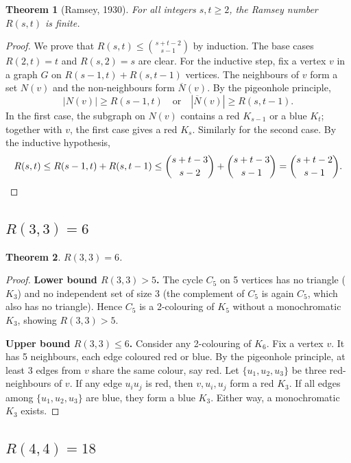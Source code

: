 \documentclass[12pt,a4paper]{amsart}
\newtheorem{theorem}{Theorem}[section]
\theoremstyle{definition}
\theoremstyle{remark}
\begin{document}
\begin{theorem}[Ramsey, 1930]\label{thm:ramsey-finite}
For all integers $s,t \ge 2$, the Ramsey number $R(s,t)$ is finite.
\end{theorem}

\begin{proof}
We prove that $R(s,t) \le \binom{s+t-2}{s-1}$ by induction.  The base cases
$R(2,t)=t$ and $R(s,2)=s$ are clear.  For the inductive step, fix a vertex $v$
in a graph $G$ on $R(s-1,t)+R(s,t-1)$ vertices.  The neighbours of $v$ form
a set $N(v)$ and the non-neighbours form $\overline{N}(v)$.  By the pigeonhole
principle,
\[
  |N(v)| \ge R(s-1,t) \quad \text{or} \quad |\overline{N}(v)| \ge R(s,t-1).
\]
In the first case, the subgraph on $N(v)$ contains a red $K_{s-1}$ or a blue
$K_t$; together with $v$, the first case gives a red $K_s$.  Similarly for the
second case.  By the inductive hypothesis,
\[
  R(s,t) \le R(s-1,t) + R(s,t-1) \le \binom{s+t-3}{s-2} + \binom{s+t-3}{s-1}
  = \binom{s+t-2}{s-1}.\qedhere
\]
\end{proof}

\subsection{\texorpdfstring{$R(3,3) = 6$}{R(3,3) = 6}}

\begin{theorem}\label{thm:r33}
$R(3,3) = 6$.
\end{theorem}

\begin{proof}
\textbf{Lower bound $R(3,3) > 5$.}
The cycle $C_5$ on 5 vertices has no triangle ($K_3$) and no independent set of
size 3 (the complement of $C_5$ is again $C_5$, which also has no triangle).
Hence $C_5$ is a 2-colouring of $K_5$ without a monochromatic $K_3$, showing
$R(3,3) > 5$.

\textbf{Upper bound $R(3,3) \le 6$.}
Consider any 2-colouring of $K_6$.  Fix a vertex $v$.  It has 5 neighbours,
each edge coloured red or blue.  By the pigeonhole principle, at least 3 edges
from $v$ share the same colour, say red.  Let $\{u_1, u_2, u_3\}$ be three
red-neighbours of $v$.  If any edge $u_i u_j$ is red, then $v, u_i, u_j$ form
a red $K_3$.  If all edges among $\{u_1, u_2, u_3\}$ are blue, they form a blue
$K_3$.  Either way, a monochromatic $K_3$ exists.
\end{proof}

\subsection{\texorpdfstring{$R(4,4) = 18$}{R(4,4) = 18}}
\end{document}
